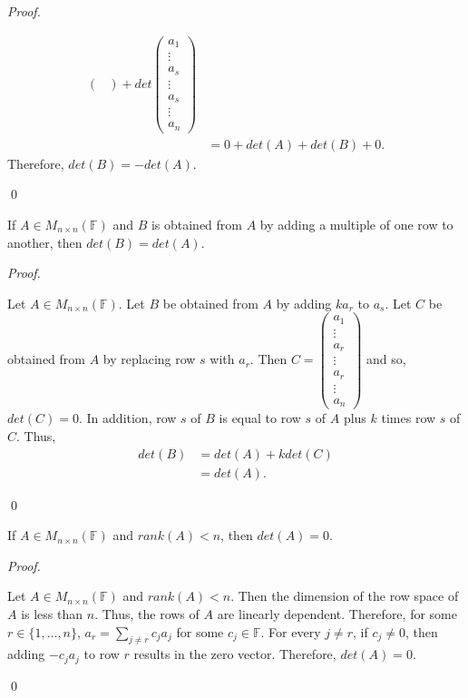 \documentclass[12pt]{article}
\newenvironment{theorem}[2][Theorem]{\begin{trivlist}
\item[\hskip \labelsep {\bfseries #1}\hskip \labelsep {\bfseries #2.}]}{\end{trivlist}}
\newenvironment{corollary}[2][Corollary]{\begin{trivlist}
\item[\hskip \labelsep {\bfseries #1}\hskip \labelsep {\bfseries #2}]}{\end{trivlist}}
\newenvironment{sol}
    {\emph{Proof.}
    }
    {
    \qed
    }
\begin{document}
\begin{sol}
\begin{align*}
\begin{pmatrix}
    \end{pmatrix} + det\begin{pmatrix}
    a_1 \\ \vdots \\ a_s \\ \vdots \\ a_s \\ \vdots \\ a_n
    \end{pmatrix} \\
    &= 0 + det(A) + det(B) + 0.
\end{align*} Therefore, $det(B) = -det(A)$.
\end{sol}

\begin{theorem}{4.6}
If $A \in M_{n \times n}(\mathbb{F})$ and $B$ is obtained from $A$ by adding a multiple of one row to another, then $det(B) = det(A)$.
\end{theorem}

\begin{sol}
Let $A \in M_{n \times n}(\mathbb{F})$. Let $B$ be obtained from $A$ by adding $ka_r$ to $a_s$. Let $C$ be obtained from $A$ by replacing row $s$ with $a_r$. Then $C = \begin{pmatrix}
a_1 \\ \vdots \\ a_r \\ \vdots \\ a_r \\ \vdots \\ a_n
\end{pmatrix}$ and so, $det(C) = 0$. In addition, row $s$ of $B$ is equal to row $s$ of $A$ plus $k$ times row $s$ of $C$. Thus, \begin{align*}
    det(B) &= det(A) + kdet(C) \\ &= det(A).
\end{align*}
\end{sol}

\begin{corollary}{10}
If $A \in M_{n \times n}(\mathbb{F})$ and $rank(A) < n$, then $det(A) = 0$.
\end{corollary}

\begin{sol}
Let $A \in M_{n \times n}(\mathbb{F})$ and $rank(A) < n$. Then the dimension of the row space of $A$ is less than $n$. Thus, the rows of $A$ are linearly dependent. Therefore, for some $r \in \{ 1, \dots, n \}$, $a_r = \sum_{j \neq r}c_ja_j$ for some $c_j \in \mathbb{F}$. For every $j \neq r$, if $c_j \neq 0$, then adding $-c_ja_j$ to row $r$ results in the zero vector. Therefore, $det(A) = 0$.
\end{sol}
\end{document}
